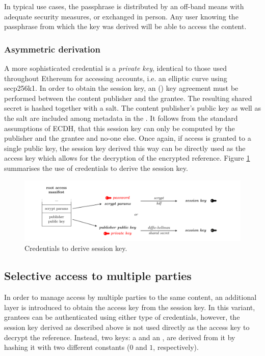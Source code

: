 In typical use cases, the passphrase is distributed by an off-band means with adequate security measures, or exchanged in person. Any user knowing the passphrase from which the key was derived will be able to access the content.

\subsubsection{Asymmetric derivation}

A more sophisticated credential is a \emph{private key}, identical to those used throughout Ethereum for accessing accounts, i.e. an  elliptic curve using secp256k1. In order to obtain the session key, an  () key agreement must be performed between the content publisher and the grantee. The resulting shared secret is hashed together with a salt. The content publisher's public key as well as the salt are included among metadata in the . It follows from the standard assumptions of ECDH, that this session key can only be computed by the publisher and the grantee and no-one else. 
Once again, if access is granted to a single public key, the session key derived this way can be directly used as the access key which allows for the decryption of the encrypted reference. 
Figure \ref{fig:credentials-to-derive-session-key} summarises the use of credentials to derive the session key.

\begin{figure}[htbp]
\centering
\includegraphics[width=\textwidth]{fig/credentials-to-derive-session-key.pdf}
\caption[Credentials to derive session key  \statusyellow]{Credentials to derive session key.}
\label{fig:credentials-to-derive-session-key}
\end{figure}


\subsection{Selective access to multiple parties\statusgreen}

In order to manage access by multiple parties to the same content, an additional layer is introduced to obtain the access key from the session key. In this variant, grantees can be authenticated using either type of credentials, however, the session key derived as
described above is not used directly as the access key to decrypt the reference. Instead, two keys: a  and an , are derived from it by hashing it with two different constants ($0$ and $1$, respectively).

